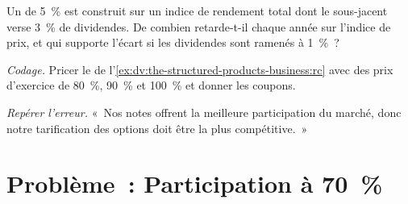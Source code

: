 \begin{exercise}[$\star\star$]\label{exo:dv:the-structured-products-business:6}
Un  de 5~\% est construit sur un indice de rendement total dont le sous-jacent verse 3~\% de dividendes. De combien retarde-t-il chaque
année sur l'indice de prix, et qui supporte l'écart si les dividendes sont ramenés à 1~\%~?
\end{exercise}

\begin{exercise}[$\star\star\star$]\label{exo:dv:the-structured-products-business:7}
\emph{Codage.} Pricer le  de l'\cref{ex:dv:the-structured-products-business:rc} avec des prix d'exercice de 80~\%, 90~\% et 100~\% et
donner les coupons.
\end{exercise}

\begin{exercise}[$\star\star\star$]\label{exo:dv:the-structured-products-business:8}
\emph{Repérer l'erreur.} «~Nos notes offrent la meilleure participation du marché, donc notre tarification des options doit être la plus compétitive.~»
\end{exercise}

\section{Problème~: Participation à 70~\%}

